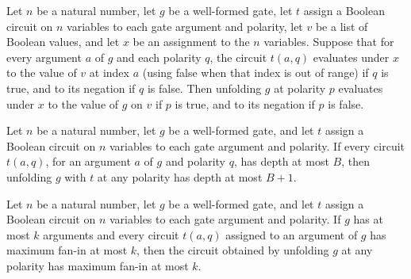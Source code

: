 \begin{theorem}
\label{BoolCircuit.unfoldGate_eval}
\leanok
{}
Let $n$ be a natural number, let $g$ be a well-formed gate, let $t$ assign a Boolean
circuit on $n$ variables to each gate argument and polarity, let $v$ be a list of
Boolean values, and let $x$ be an assignment to the $n$ variables. Suppose that for
every argument $a$ of $g$ and each polarity $q$, the circuit $t(a,q)$ evaluates under
$x$ to the value of $v$ at index $a$ (using false when that index is out of range) if
$q$ is true, and to its negation if $q$ is false. Then unfolding $g$ at polarity $p$
evaluates under $x$ to the value of $g$ on $v$ if $p$ is true, and to its negation if
$p$ is false.
\end{theorem}

\begin{theorem}
\label{BoolCircuit.unfoldGate_depth_le}
\leanok
{}
Let $n$ be a natural number, let $g$ be a well-formed gate, and let $t$ assign a Boolean
circuit on $n$ variables to each gate argument and polarity. If every circuit $t(a,q)$,
for an argument $a$ of $g$ and polarity $q$, has depth at most $B$, then unfolding $g$
with $t$ at any polarity has depth at most $B+1$.
\end{theorem}

\begin{theorem}
\label{BoolCircuit.unfoldGate_maxFanin_le}
\leanok
{}
Let $n$ be a natural number, let $g$ be a well-formed gate, and let $t$ assign a Boolean
circuit on $n$ variables to each gate argument and polarity. If $g$ has at most $k$
arguments and every circuit $t(a,q)$ assigned to an argument of $g$ has maximum fan-in
at most $k$, then the circuit obtained by unfolding $g$ at any polarity has maximum
fan-in at most $k$.
\end{theorem}

